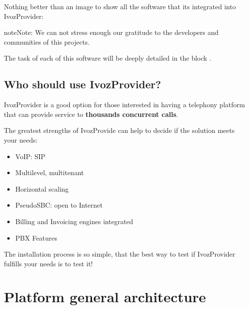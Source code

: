\documentclass[letterpaper,10pt,english]{sphinxmanual}
\begin{document}
Nothing better than an image to show all the software that its integrated
into IvozProvider:


\begin{notice}{note}{Note:}
We can not stress enough our gratitude to the developers and communities
of this projects.
\end{notice}

The task of each of this software will be deeply detailed in the block
{\hyperref[basic_concepts/architecture/index:architecture]{}}.


\section{Who should use IvozProvider?}
\label{basic_concepts/intro/use_cases::doc}\label{basic_concepts/intro/use_cases:who-should-use-ivozprovider}
IvozProvider is a good option for those interested in having a telephony
platform that can provide service to \textbf{thousands concurrent calls}.

The greatest strengths of IvozProvide can help to decide if the solution
meets your needs:
\begin{itemize}
\item {} 
VoIP: SIP

\item {} 
Multilevel, multitenant

\item {} 
Horizontal scaling

\item {} 
PseudoSBC: open to Internet

\item {} 
Billing and Invoicing engines integrated

\item {} 
PBX Features

\end{itemize}

The installation process is so simple, that the best way to test if
IvozProvider fulfills your needs is to test it!


\chapter{Platform general architecture}
\label{basic_concepts/architecture/index:platform-general-architecture}\label{basic_concepts/architecture/index::doc}\label{basic_concepts/architecture/index:architecture}
\end{document}
